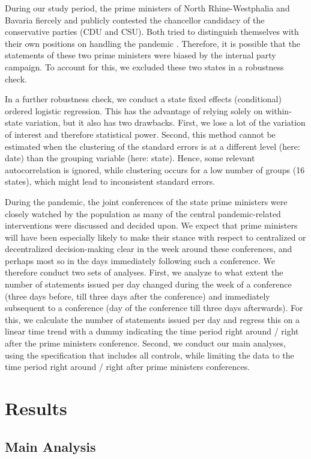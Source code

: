 \documentclass[12pt, abstract=true]{scrartcl}
\begin{document}
During our study period, the prime ministers of North Rhine-Westphalia and Bavaria fiercely and publicly contested the chancellor candidacy of the conservative parties (CDU and CSU). Both tried to distinguish themselves with their own positions on handling the pandemic \citep{Jun2023}. Therefore, it is possible that the statements of these two prime ministers were biased by the internal party campaign. To account for this, we excluded these two states in a robustness check.

In a further robustness check, we conduct a state fixed effects (conditional) ordered logistic regression. This has the advantage of relying solely on within-state variation, but it also has two drawbacks. First, we lose a lot of the variation of interest and therefore statistical power. Second, this method cannot be estimated when the clustering of the standard errors is at a different level (here: date) than the grouping variable (here: state). Hence, some relevant autocorrelation is ignored, while clustering occurs for a low number of groups (16 states), which might lead to inconsistent standard errors.

During the pandemic, the joint conferences of the state prime ministers were closely watched by the population as many of the central pandemic-related interventions were discussed and decided upon. We expect that prime ministers will have been especially likely to make their stance with respect to centralized or decentralized decision-making clear in the week around these conferences, and perhaps most so in the days immediately following such a conference. We therefore conduct two sets of analyses. First, we analyze to what extent the number of statements issued per day changed during the week of a conference (three days before, till three days after the conference) and immediately subsequent to a conference (day of the conference till three days afterwards). For this, we calculate the number of statements issued per day and regress this on a linear time trend with a dummy indicating the time period right around / right after the prime ministers conference. Second, we conduct our main analyses, using the specification that includes all controls, while limiting the data to the time period right around / right after prime ministers conferences.

\section{Results}\label{sec.results}
\subsection{Main Analysis}
\end{document}
